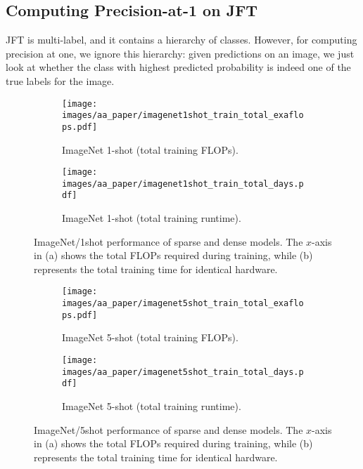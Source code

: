 \documentclass{article}
\begin{document}
\subsection{Computing Precision-at-1 on JFT}\label{sec:prec_at_1_jft}
JFT is multi-label, and it contains a hierarchy of classes.
However, for computing precision at one, we ignore this hierarchy: given predictions on an image, we just look at whether the class with highest predicted probability is indeed one of the true labels for the image.

\begin{figure}
\centering
\begin{subfigure}{.50\textwidth}
  \centering
  \texttt{[image: images/aa\_paper/imagenet1shot\_train\_total\_exaflops.pdf]}
  \caption{ImageNet 1-shot (total training FLOPs).}
  \label{im:fewshot_1_flops}
\end{subfigure}\begin{subfigure}{.50\textwidth}
  \centering
  \texttt{[image: images/aa\_paper/imagenet1shot\_train\_total\_days.pdf]}
  \caption{ImageNet 1-shot (total training runtime).}
  \label{im:fewshot_1_runtime}
\end{subfigure}
\caption{
ImageNet/1shot performance of sparse and dense models.
The $x$-axis in (a) shows the total FLOPs required during training, while (b) represents the total training time for identical hardware.
}
\label{im:fewshot_1_flops_and_runtime}
\end{figure}


\begin{figure}
\centering
\begin{subfigure}{.50\textwidth}
  \centering
  \texttt{[image: images/aa\_paper/imagenet5shot\_train\_total\_exaflops.pdf]}
  \caption{ImageNet 5-shot (total training FLOPs).}
  \label{im:fewshot_5_flops}
\end{subfigure}\begin{subfigure}{.50\textwidth}
  \centering
  \texttt{[image: images/aa\_paper/imagenet5shot\_train\_total\_days.pdf]}
  \caption{ImageNet 5-shot (total training runtime).}
  \label{im:fewshot_5_runtime}
\end{subfigure}
\caption{
ImageNet/5shot performance of sparse and dense models.
The $x$-axis in (a) shows the total FLOPs required during training, while (b) represents the total training time for identical hardware.
}
\label{im:fewshot_5_flops_and_runtime}
\end{figure}
\end{document}
